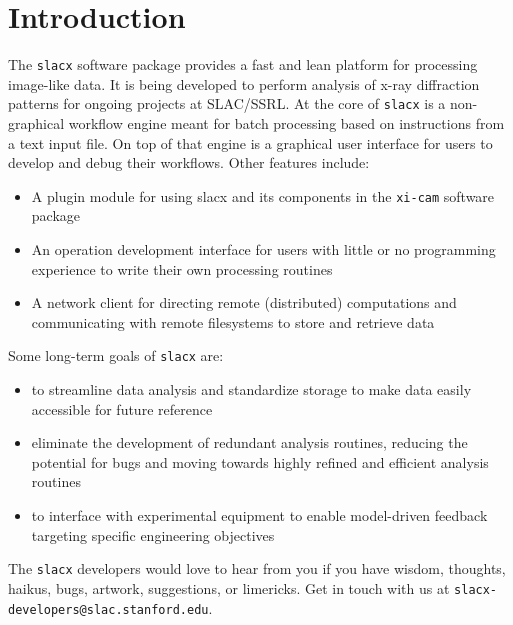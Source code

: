 \section{Introduction}

The \verb|slacx| software package provides 
a fast and lean platform for processing image-like data.
It is being developed to perform analysis of x-ray diffraction patterns 
for ongoing projects at SLAC/SSRL.
At the core of \verb|slacx| is a non-graphical workflow engine
meant for batch processing based on instructions from a text input file.
On top of that engine is a graphical user interface 
for users to develop and debug their workflows.
Other features include:
\begin{itemize}
\item A plugin module for using slacx and its components 
    in the \verb|xi-cam| software package
\item An operation development interface 
    for users with little or no programming experience 
    to write their own processing routines 
\item A network client for directing remote (distributed) computations 
    and communicating with remote filesystems to store and retrieve data
\end{itemize}
Some long-term goals of \verb|slacx| are: 
\begin{itemize}
\item to streamline data analysis and standardize storage 
    to make data easily accessible for future reference
\item eliminate the development of redundant analysis routines,
    reducing the potential for bugs
    and moving towards highly refined and efficient analysis routines
\item to interface with experimental equipment
    to enable model-driven feedback 
    targeting specific engineering objectives
\end{itemize}

The \verb|slacx| developers would love to hear from you
if you have wisdom, thoughts, haikus, bugs, artwork, suggestions, or limericks.
Get in touch with us at \verb|slacx-developers@slac.stanford.edu|.




